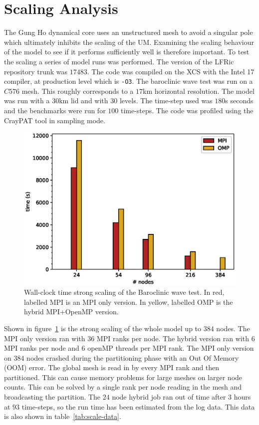 \section{\label{sec:scale}Scaling Analysis}
The Gung Ho dynamical core uses an unstructured mesh to avoid a
singular pole which ultimately inhibits the scaling of the
UM. Examining the scaling behaviour of the model to see if it
performs sufficiently well is therefore important. To test the scaling a series
of model runs was performed. The version of the LFRic repository trunk
was $17483$. The code was compiled on the XCS with the Intel 17
compiler, at production level which is \verb+-O3+. The baroclinic wave
test was run on a $C576$ mesh. This roughly corresponds to a $17$km
horizontal resolution. The model was run with a $30$km lid and with
$30$ levels.  The time-step used was $180$s
seconds and the benchmarks were run for $100$ time-steps. The code was
profiled using the CrayPAT tool in sampling mode. 

\begin{figure}
\centering\includegraphics[width=1.0\linewidth]{figs/wc-scale.eps}
\caption{\label{fig:wc_scale}Wall-clock time strong scaling of the 
  Baroclinic wave test. In red, labelled MPI is an MPI only
  version. In yellow, labelled OMP is the hybrid MPI+OpenMP version.}
\end{figure} 

Shown in figure~\ref{fig:wc_scale} is the strong scaling of the whole
model up to $384$ nodes. The MPI only version ran with $36$ MPI ranks
per node. The hybrid version ran with $6$ MPI ranks per node and $6$
openMP threads per MPI rank. The MPI only version on $384$ nodes
crashed during the partitioning phase with an Out Of Memory (OOM)
error. The global mesh is read in by every MPI rank and then
partitioned. This can cause memory problems for large meshes on larger
node counts. This can be solved by a single rank per node reading in
the mesh and broadcasting the partition. The $24$ node hybrid job ran
out of time after 3 hours at $93$ time-steps, so the run time has been
estimated from the log data. This data is also shown in
table~\ref{tab:scale-data}.

